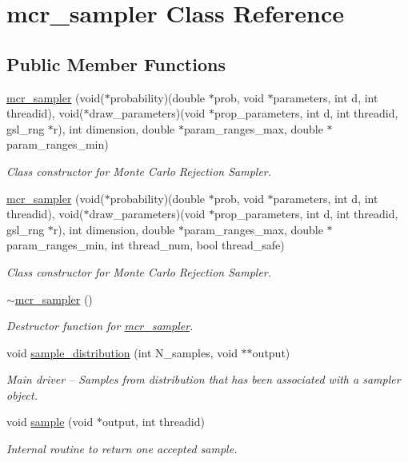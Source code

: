 \hypertarget{classmcr__sampler}{}\section{mcr\+\_\+sampler Class Reference}
\label{classmcr__sampler}
\subsection*{Public Member Functions}
\begin{DoxyCompactItemize}
\item 
\hyperlink{classmcr__sampler_a9f9da59f2b90a771e1fcd659aedbf920}{mcr\+\_\+sampler} (void($\ast$probability)(double $\ast$prob, void $\ast$parameters, int d, int threadid), void($\ast$draw\+\_\+parameters)(void $\ast$prop\+\_\+parameters, int d, int threadid, gsl\+\_\+rng $\ast$r), int dimension, double $\ast$param\+\_\+ranges\+\_\+max, double $\ast$param\+\_\+ranges\+\_\+min)
\begin{DoxyCompactList}\small\item\em Class constructor for Monte Carlo Rejection Sampler. \end{DoxyCompactList}\item 
\hyperlink{classmcr__sampler_a180f9fed263d2a277185a57604e85dd4}{mcr\+\_\+sampler} (void($\ast$probability)(double $\ast$prob, void $\ast$parameters, int d, int threadid), void($\ast$draw\+\_\+parameters)(void $\ast$prop\+\_\+parameters, int d, int threadid, gsl\+\_\+rng $\ast$r), int dimension, double $\ast$param\+\_\+ranges\+\_\+max, double $\ast$param\+\_\+ranges\+\_\+min, int thread\+\_\+num, bool thread\+\_\+safe)
\begin{DoxyCompactList}\small\item\em Class constructor for Monte Carlo Rejection Sampler. \end{DoxyCompactList}\item 
\hyperlink{classmcr__sampler_af1dc1bfe87a15819731e8082751ae224}{$\sim$mcr\+\_\+sampler} ()
\begin{DoxyCompactList}\small\item\em Destructor function for \hyperlink{classmcr__sampler}{mcr\+\_\+sampler}. \end{DoxyCompactList}\item 
void \hyperlink{classmcr__sampler_a5ba6b047e2f5cb8df12dcf593f3eb45e}{sample\+\_\+distribution} (int N\+\_\+samples, void $\ast$$\ast$output)
\begin{DoxyCompactList}\small\item\em Main driver -- Samples from distribution that has been associated with a sampler object. \end{DoxyCompactList}\item 
void \hyperlink{classmcr__sampler_a7127ccf1f0f385b6bb9acbe5d5244990}{sample} (void $\ast$output, int threadid)
\begin{DoxyCompactList}\small\item\em Internal routine to return one accepted sample. \end{DoxyCompactList}\end{DoxyCompactItemize}

